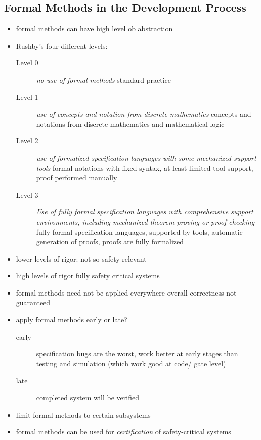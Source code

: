 \documentclass[a4paper, 10pt]{article}
\begin{document}
\subsection*{Formal Methods in the Development Process}
\begin{itemize}
    \item formal methods can have high level ob abstraction
    \item Rushby's four different levels:
    \begin{description}
        \item[Level 0] \emph{no use of formal methods} standard practice
        \item[Level 1] \emph{use of concepts and notation from discrete mathematics} concepts and notations from discrete mathematics and mathematical logic
        \item[Level 2] \emph{use of formalized specification languages with some mechanized support tools} formal notations with fixed syntax, at least limited tool support, proof performed manually
        \item[Level 3] \emph{Use of fully formal specification languages with comprehensive support environments, including mechanized theorem proving or proof checking} fully formal specification languages, supported by tools, automatic generation of proofs, proofs are fully formalized
    \end{description}
    \item lower levels of rigor: not so safety relevant
    \item high levels of rigor \follows fully safety critical systems
    \item formal methods need not be applied everywhere \follows overall correctness not guaranteed
    \item apply formal methods early or late?
    \begin{description}
        \item[early] specification bugs are the worst, work better at early stages than testing and simulation (which work good at code/ gate level)
        \item[late] completed system will be verified
    \end{description}
    \item limit formal methods to certain subsystems
    \item formal methods can be used for \emph{certification} of safety-critical systems
\end{itemize}
\end{document}
